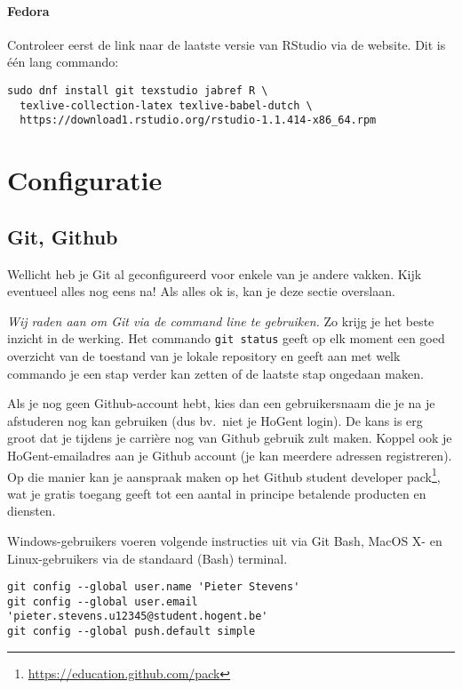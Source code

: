 \paragraph{Fedora}

Controleer eerst de link naar de laatste versie van RStudio via de website. Dit is één lang commando:

\begin{verbatim}
sudo dnf install git texstudio jabref R \
  texlive-collection-latex texlive-babel-dutch \
  https://download1.rstudio.org/rstudio-1.1.414-x86_64.rpm
\end{verbatim}

\section{Configuratie}

\subsection{Git, Github}

Wellicht heb je Git al geconfigureerd voor enkele van je andere vakken. Kijk eventueel alles nog eens na! Als alles ok is, kan je deze sectie overslaan.

\emph{Wij raden aan om Git via de command line te gebruiken.} Zo krijg je het beste inzicht in de werking. Het commando \texttt{git status} geeft op elk moment een goed overzicht van de toestand van je lokale repository en geeft aan met welk commando je een stap verder kan zetten of de laatste stap ongedaan maken.

Als je nog geen Github-account hebt, kies dan een gebruikersnaam die je na je afstuderen nog kan gebruiken (dus bv.~niet je HoGent login). De kans is erg groot dat je tijdens je carrière nog van Github gebruik zult maken. Koppel ook je HoGent-emailadres aan je Github account (je kan meerdere adressen registreren). Op die manier kan je aanspraak maken op het Github student developer pack\footnote{\url{https://education.github.com/pack}}, wat je gratis toegang geeft tot een aantal in principe betalende producten en diensten.

Windows-gebruikers voeren volgende instructies uit via Git Bash, MacOS X- en Linux-gebruikers via de standaard (Bash) terminal.

\begin{verbatim}
git config --global user.name 'Pieter Stevens'
git config --global user.email 'pieter.stevens.u12345@student.hogent.be'
git config --global push.default simple
\end{verbatim}

